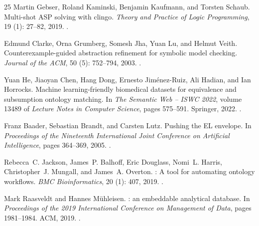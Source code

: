 \documentclass[10pt]{article}
\theoremstyle{accentdef}
\begin{document}
\begin{thebibliography}{25}
Martin Gebser, Roland Kaminski, Benjamin Kaufmann, and Torsten Schaub.
\newblock Multi-shot {ASP} solving with clingo.
\newblock \emph{Theory and Practice of Logic Programming}, 19
  (1): 27--82, 2019.
\newblock {}.

Edmund Clarke, Orna Grumberg, Somesh Jha, Yuan Lu, and Helmut Veith.
\newblock Counterexample-guided abstraction refinement for symbolic model
  checking.
\newblock \emph{Journal of the ACM}, 50 (5): 752--794, 2003.
\newblock {}.

Yuan He, Jiaoyan Chen, Hang Dong, Ernesto Jim{\'e}nez-Ruiz, Ali Hadian, and Ian
  Horrocks.
\newblock Machine learning-friendly biomedical datasets for equivalence and
  subsumption ontology matching.
\newblock In \emph{The Semantic Web -- ISWC 2022}, volume 13489 of
  \emph{Lecture Notes in Computer Science}, pages 575--591. Springer, 2022.
\newblock {}.

Franz Baader, Sebastian Brandt, and Carsten Lutz.
\newblock Pushing the {EL} envelope.
\newblock In \emph{Proceedings of the Nineteenth International Joint Conference
  on Artificial Intelligence}, pages 364--369, 2005.
\newblock {}.

Rebecca~C. Jackson, James~P. Balhoff, Eric Douglass, Nomi~L. Harris,
  Christopher~J. Mungall, and James~A. Overton.
: A tool for automating ontology workflows.
\newblock \emph{BMC Bioinformatics}, 20 (1): 407, 2019.
\newblock {}.

Mark Raasveldt and Hannes M{\"u}hleisen.
: an embeddable analytical database.
\newblock In \emph{Proceedings of the 2019 International Conference on
  Management of Data}, pages 1981--1984. ACM, 2019.
\newblock {}.

\end{thebibliography}
\end{document}
